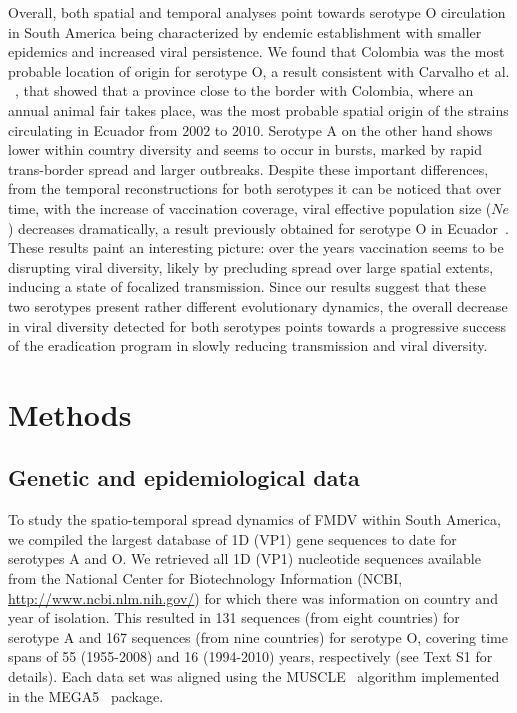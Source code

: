 \documentclass[10pt]{article}
\begin{document}
Overall, both spatial and temporal analyses point towards serotype O circulation in South America being characterized by endemic establishment with smaller epidemics and increased viral persistence. 
We found that Colombia was the most probable location of origin for serotype O, a result consistent with  Carvalho et al. ~\cite{Carvalho2013}, that showed that a province close to the border with Colombia, where an annual animal fair takes place, was the most probable spatial origin of the strains circulating in Ecuador from $2002$ to $2010$.
Serotype A on the other hand shows lower within country diversity and seems to occur in bursts, marked by rapid trans-border spread and larger outbreaks. 
Despite these important differences, from the temporal reconstructions for both serotypes it can be noticed that over time, with the increase of vaccination coverage, viral effective population size ($Ne$) decreases dramatically, a result previously obtained for serotype O in Ecuador~\cite{Carvalho2013}.
These results paint an interesting picture: over the years vaccination seems to be disrupting viral diversity, likely by precluding spread over large spatial extents, inducing a state of focalized transmission.
Since our results suggest that these two serotypes present rather different evolutionary dynamics, the overall decrease in viral diversity detected for both serotypes points towards a progressive success of the eradication program in slowly reducing transmission and viral diversity.

\section*{Methods}

\subsection*{Genetic and epidemiological data}

To study the spatio-temporal spread dynamics of FMDV within South America, we compiled the largest database of 1D (VP1) gene sequences to date for serotypes A and O.
We retrieved all 1D (VP1) nucleotide sequences available from the National Center for Biotechnology Information (NCBI, \url{ http://www.ncbi.nlm.nih.gov/}) for which there was information on country and year of isolation.
This resulted in 131 sequences (from eight countries) for serotype A and 167 sequences (from nine countries) for serotype O, covering time spans of 55 (1955-2008) and 16 (1994-2010) years, respectively (see Text S1 for details).
Each data set was aligned using the MUSCLE~\cite{muscle} algorithm implemented in the MEGA5~\cite{MEGA} package.
\end{document}
